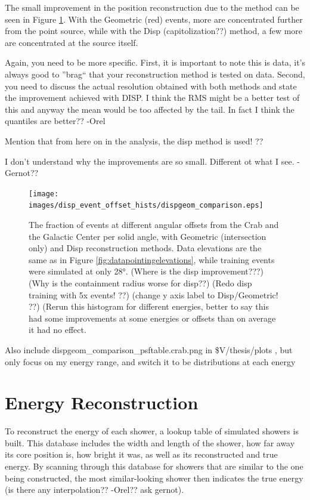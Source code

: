     The small improvement in the position reconstruction due to the \disp{} method can be seen in Figure \ref{fig:disp_event_offset}.
    With the Geometric (red) events, more are concentrated further from the point source, while with the {\color{red}Disp (capitolization??)} method, a few more are concentrated at the source itself.
    
    {\color{red}Again, you need to be more specific. First, it is important to note this is data, it's always good to ''brag`` that your reconstruction method is tested on data.  Second, you need to discuss the actual resolution obtained with both methods and state the improvement achieved with DISP. I think the RMS might be a better test of this and anyway the mean would be too affected by the tail. In fact I think the quantiles are better?? -Orel}
    
    {\color{red} Mention that from here on in the analysis, the disp method is used! ??}
  
    {\color{red}I don't understand why the improvements are so small.  Different ot what I see. -Gernot?? }

    \begin{figure}[ht]
      \centering
      \texttt{[image: images/disp\_event\_offset\_hists/dispgeom\_comparison.eps]}
      \caption[DISP Offset Improvement]{
        The fraction of events at different angular offsets from the Crab and the Galactic Center per solid angle, with Geometric (intersection only) and Disp reconstruction methods.
        Data elevations are the same as in Figure \ref{fig:datapointingelevations}, while training events were simulated at only \ang{28}.
        {\color{red}(Where is the disp improvement???)}
        {\color{red}(Why is the containment radius worse for disp??)}
        {\color{red}(Redo disp training with 5x events! ??)}
        {\color{red}(change y axis label to Disp/Geometric! ??)}
        {\color{red}(Rerun this histogram for different energies, better to say this had some improvements at some energies or offsets than on average it had no effect.}
      }
      \label{fig:disp_event_offset}
    \end{figure}
  
  {\color{red}Also include dispgeom\_comparison\_psftable.crab.png in \$V/thesis/plots , but only focus on my energy range, and switch it to be distributions at each energy}

  \FloatBarrier

\section{Energy Reconstruction}\label{subsec:enrecon}
  To reconstruct the energy of each shower, a lookup table of simulated showers is built.
This database includes the width and length of the shower, how far away its core position is, how bright it was, as well as its reconstructed and true energy.
  By scanning through this database for showers that are similar to the one being constructed, the most similar-looking shower then indicates the true energy {\color{red} (is there any interpolation?? -Orel?? ask gernot)}.


